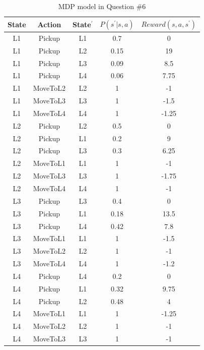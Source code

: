 \documentclass[conference]{styles/acmsiggraph}
\begin{document}
\begin{table}[!h]
	\centering
	\caption{MDP model in Question \#6}
	\label{tab:q6}
	\begin{tabular}{@{}ccccc@{}}
	\toprule
	State & Action   & State$^{\prime}$ & $P(s^{\prime}|s, a)$ & $Reward(s,a,s^{\prime})$ \\ \midrule
	L1    & Pickup   & L1     & 0.7       & 0              \\
	L1    & Pickup   & L2     & 0.15      & 19             \\
	L1    & Pickup   & L3     & 0.09     & 8.5           \\
	L1    & Pickup   & L4     & 0.06       & 7.75          \\
	L1    & MoveToL2 & L2     & 1         & -1             \\
	L1    & MoveToL3 & L3     & 1         & -1.5           \\
	L1    & MoveToL4 & L4     & 1         & -1.25          \\
	L2    & Pickup   & L2     & 0.5       & 0              \\
	L2    & Pickup   & L1     & 0.2      & 9          \\
	L2    & Pickup   & L3     & 0.3      & 6.25           \\
	L2    & MoveToL1 & L1     & 1         & -1             \\
	L2    & MoveToL3 & L3     & 1         & -1.75          \\
	L2    & MoveToL4 & L4     & 1         & -1          \\
	L3    & Pickup   & L3     & 0.4       & 0              \\
	L3    & Pickup   & L1     & 0.18       & 13.5           \\
	L3    & Pickup   & L4     & 0.42       & 7.8            \\
	L3    & MoveToL1 & L1     & 1         & -1.5           \\
	L3    & MoveToL2 & L2    & 1         & -1          \\
	L3    & MoveToL4 & L4     & 1         & -1.2           \\
	L4    & Pickup   & L4     & 0.2       & 0              \\
	L4    & Pickup   & L1     & 0.32       & 9.75           \\
	L4    & Pickup   & L2     & 0.48       & 4              \\
	L4    & MoveToL1 & L1     & 1         & -1.25          \\
	L4    & MoveToL2 & L2     & 1         & -1             \\
	L4    & MoveToL3 & L3     & 1         & -1             \\ \bottomrule
	\end{tabular}
	\end{table}
\end{document}
